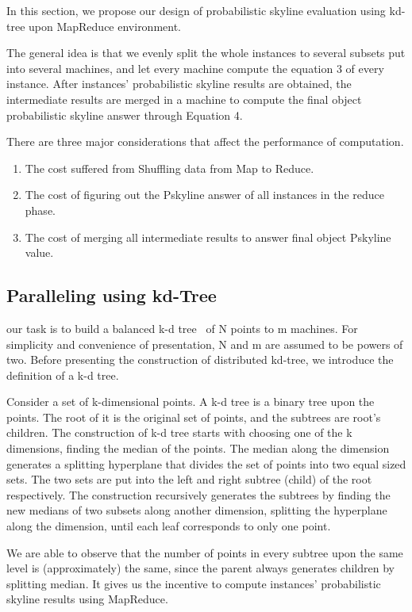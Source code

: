 In this section, we propose our design of probabilistic skyline evaluation using kd-tree upon MapReduce environment.

The general idea is that we evenly split the whole instances to several subsets put into several machines, and let every machine compute the equation 3 of every instance. After instances' probabilistic skyline results are obtained, the intermediate results are merged in a machine to compute the final object probabilistic skyline answer through Equation 4.

There are three major considerations that affect the performance of computation.

\begin{enumerate}
  \item The cost suffered from Shuffling data from Map to Reduce.
  \item The cost of figuring out the Pskyline answer of all instances in the reduce phase.
  \item The cost of merging all intermediate results to answer final object Pskyline value.
\end{enumerate}

\subsection{Paralleling using kd-Tree}
our task is to build a balanced k-d tree~\cite{kd} of N points to m machines. For simplicity and convenience of presentation, N and m are assumed to be powers of two. Before presenting the construction of distributed kd-tree, we introduce the definition of a k-d tree.

Consider a set of k-dimensional points. A k-d tree is a binary tree upon the points. The root of it is the original set of points, and the subtrees are root's children. The construction of k-d tree starts with choosing one of the k dimensions, finding the median of the points. The median along the dimension generates a splitting hyperplane that divides the set of points into two equal sized sets. The two sets are put into the left and right subtree (child) of the root respectively. The construction recursively generates the subtrees by finding the new medians of two subsets along another dimension, splitting the hyperplane along the dimension, until each leaf corresponds to only one point.

We are able to observe that the number of points in every subtree upon the same level is (approximately) the same, since the parent always generates children by splitting median. It gives us the incentive to compute instances' probabilistic skyline results using MapReduce.

